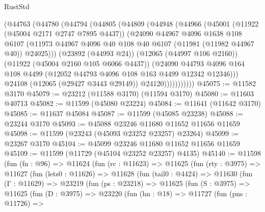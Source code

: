\begin{lexlean}{RustStd}
\begin{coremodule}
              (@44763
                (@44780
                  (@44794
                    (@44805
                      (@44809
                        (@44948
                          (@44966
                            (@45001
                              (@11922 (@45004 @2171 @2747 @7895 @4437))
                              (@24090
                                @44967
                                @4096
                                @1638
                                @108
                                @6107
                                (@11973
                                  @44967
                                  @4096
                                  @40
                                  @108
                                  @40
                                  @6107
                                  (@11981 (@11982 @44967 @40))
                                  @24025)))
                            (@23892 (@44993 @24))
                            (@12065 (@44997 @106 @2160))
                            (@11922 (@45004 @2160 @105 @6066 @4437))
                            (@24090
                              @44793
                              @4096
                              @164
                              @108
                              @4499
                              (@12052 @44793 @4096 @108 @163 @4499 @12342 @12346)))
                          @24108
                          (@12065 (@29427 @3443 @29149))
                          @24120)))))))))))
@45075 := @11582 @3170
@45079 := @23212 (@11588 @3170) (@11594 @3170)
@45080 := @11603 @40713
@45082 := @11599 (@45080 @23224)
@45084 := @11641 (@11642 @3170)
@45085 := @11637 @45084
@45087 := @11599 (@45085 @23238)
@45088 := @23244 @3170
@45093 := @45088 @23246 @11680 @11652 @11656 @11659
@45098 := @11599 (@23243 (@45093 @23252 @23257) @23264)
@45099 := @23267 @3170
@45104 := @45099 @23246 @11680 @11652 @11656 @11659
@45109 := @11599 (@11729 (@45104 @23252 @23257) @4135)
@45140 := @11598
    (fun (fn : @96) =>
    @11624
      (fun (rc : @11623) =>
      @11625
        (fun (rty : @3975) =>
        @11627
          (fun (lets0 : @11626) =>
          @11628
            (fun (tail0 : @4424) =>
            @11630
              (fun (Γ : @11629) =>
              @23219
                (fun (ps : @23218) =>
                @11625
                  (fun (S : @3975) =>
                  @11625
                    (fun (D : @3975) =>
                    @23220
                      (fun (hn : @18) =>
                      @11727
                        (fun (pns : @11726) =>

\end{coremodule}
\end{lexlean}
